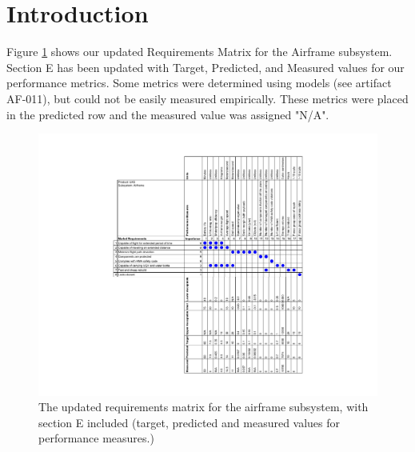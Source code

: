 \documentclass[]{auvsi_doc}
\begin{document}
\begin{AUVSITitlePage}
\begin{artifacttable}
\end{artifacttable}
\end{AUVSITitlePage}

\section{Introduction}
Figure \ref{fig:reqmatrix} shows our updated Requirements Matrix for the Airframe subsystem. Section E has been updated with Target, Predicted, and Measured values for our performance metrics. Some metrics were determined using models (see artifact AF-011), but could not be easily measured empirically. These metrics were placed in the predicted row and the measured value was assigned "N/A".


\begin{figure}[h!]
	\includegraphics[width=1.2\columnwidth]{reqmatrix.pdf}
	\caption{The updated requirements matrix for the airframe subsystem, with section E included (target, predicted and measured values for performance measures.)}
	\label{fig:reqmatrix}
\end{figure}
\end{document}
